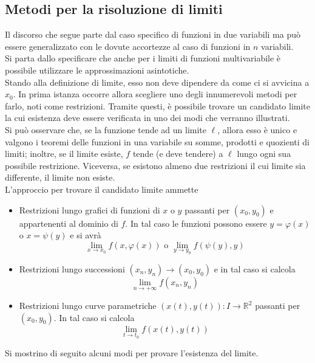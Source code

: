 \subsection{Metodi per la risoluzione di limiti}
Il discorso che segue parte dal caso specifico di funzioni in due variabili ma può essere generalizzato con le dovute accortezze al caso di funzioni in $n$ variabili.\\
Si parta dallo specificare che anche per i limiti di funzioni multivariabile è possibile utilizzare le approssimazioni asintotiche.\\
Stando alla definizione di limite, esso non deve dipendere da come ci si avvicina a $x_0$. In prima istanza occorre allora scegliere uno degli innumerevoli metodi per farlo, noti come restrizioni. Tramite questi, è possibile trovare un candidato limite la cui esistenza deve essere verificata in uno dei modi che verranno illustrati.\\
Si può osservare che, se la funzione tende ad un limite $\ell$, allora esso è unico e valgono i teoremi delle funzioni in una variabile su somme, prodotti e quozienti di limiti; inoltre, se il limite esiste, $f$ tende (e deve tendere) a $\ell$ lungo ogni sua possibile restrizione. Viceversa, se esistono almeno due restrizioni il cui limite sia differente, il limite non esiste.\\
L'approccio per trovare il candidato limite ammette
\begin{itemize}
    \item Restrizioni lungo grafici di funzioni di $x$ o $y$ passanti per $(x_0, y_0)$ e appartenenti al dominio di $f$. In tal caso le funzioni possono essere $y= \varphi(x)$ o $x=\psi(y)$ e si avrà
    \begin{equation}
    \lim_{x \to x_0} f(x, \varphi(x)) \text{ o } \lim_{y \to y_0}{f(\psi(y), y)}
    \end{equation}
    \item Restrizioni lungo successioni $(x_n, y_n) \to (x_0, y_0)$ e in tal caso si calcola
    \begin{equation}
        \lim_{n \to +\infty}{f(x_n,y_n)}
    \end{equation}
    \item Restrizioni lungo curve parametriche $(x(t), y(t)): I \to \mathbb{R}^2$ passanti per $(x_0, y_0)$. In tal caso si calcola
    \begin{equation}
        \lim_{t \to t_0}{f(x(t), y(t))}
    \end{equation}
\end{itemize}
Si mostrino di seguito alcuni modi per provare l'esistenza del limite.

